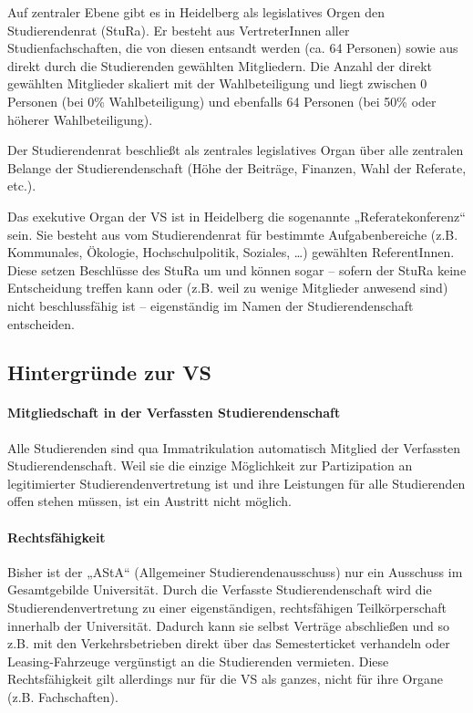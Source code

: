 Auf zentraler Ebene gibt es in Heidelberg als legislatives Orgen den Studierendenrat (StuRa). 
Er besteht aus VertreterInnen aller Studienfachschaften, die von diesen entsandt werden
(ca. 64 Personen) sowie aus direkt durch die Studierenden gewählten Mitgliedern.
Die Anzahl der direkt gewählten Mitglieder skaliert mit der Wahlbeteiligung
und liegt zwischen 0 Personen (bei 0\% Wahlbeteiligung) und ebenfalls 64 Personen
(bei 50\% oder höherer Wahlbeteiligung).

Der Studierendenrat beschließt als zentrales legislatives Organ über alle
zentralen Belange der Studierendenschaft (Höhe der Beiträge, Finanzen,
Wahl der Referate, etc.).

Das exekutive Organ der VS ist in Heidelberg die sogenannte „Referatekonferenz“ sein.
Sie besteht aus vom Studierendenrat für bestimmte Aufgabenbereiche (z.B.
Kommunales, Ökologie, Hochschulpolitik, Soziales, \dots) gewählten
ReferentInnen. Diese setzen Beschlüsse des StuRa um und können sogar --
sofern der StuRa keine Entscheidung treffen kann oder (z.B. weil zu
wenige Mitglieder anwesend sind) nicht beschlussfähig ist --
eigenständig im Namen der Studierendenschaft entscheiden.

\subsection{Hintergründe zur VS}

\paragraph{Mitgliedschaft in der Verfassten Studierendenschaft}

Alle Studierenden sind qua Immatrikulation automatisch Mitglied der
Verfassten Studierendenschaft. Weil sie die einzige Möglichkeit zur
Partizipation an legitimierter Studierendenvertretung ist und ihre
Leistungen für alle Studierenden offen stehen müssen, ist ein Austritt
nicht möglich.

\paragraph{Rechtsfähigkeit}

Bisher ist der „AStA“ (Allgemeiner Studierendenausschuss) nur ein Ausschuss
im Gesamtgebilde Universität. Durch die Verfasste Studierendenschaft wird
die Studierendenvertretung zu einer eigenständigen, rechtsfähigen Teilkörperschaft
innerhalb der Universität. Dadurch kann sie selbst Verträge abschließen und
so z.B. mit den Verkehrsbetrieben direkt über das Semesterticket verhandeln
oder Leasing-Fahrzeuge vergünstigt an die Studierenden vermieten.
Diese Rechtsfähigkeit gilt allerdings nur für die VS als ganzes,
nicht für ihre Organe (z.B. Fachschaften).

